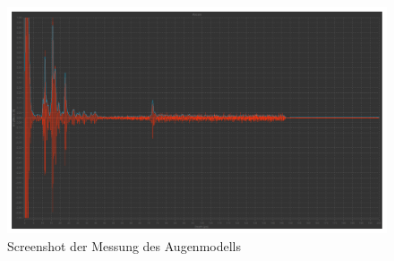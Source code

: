\begin{figure}
  \centering
  \includegraphics[width = 0.8\linewidth]{pictures/auge/Messung1Auge.pdf}
  \caption{Screenshot der Messung des Augenmodells}
  \label{fig:auge}
\end{figure}